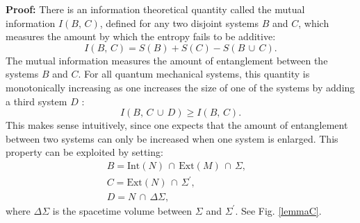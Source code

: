 \documentclass{article}
\begin{document}
\textbf{Proof:} There is an information theoretical quantity called the mutual information $I(B,\,C)$, defined for any two disjoint systems $B$ and $C$, which measures the amount by which the entropy fails to be additive:
\begin{equation}\label{I}
I(B,\,C) = S(B) + S(C) - S(B\,\cup\,C).
\end{equation}
The mutual information measures the amount of entanglement between the systems $B$ and $C$.  For all quantum mechanical systems, this quantity is monotonically increasing as one increases the size of one of the systems by adding a third system $D$ \cite{Imono}:
\begin{equation}\label{mono}
I(B,\,C\,\cup\,D) \ge I(B,\,C).
\end{equation}
This makes sense intuitively, since one expects that the amount of entanglement between two systems can only be increased when one system is enlarged.  This property can be exploited by setting:
\begin{eqnarray}
B = \mathrm{Int}(N)\,\cap\,\mathrm{Ext}(M)\,\cap\,\Sigma, & \\
C = \mathrm{Ext}(N)\,\cap\,\Sigma^\prime, & \\
D = N\,\cap\,\Delta \Sigma, &
\end{eqnarray}
where $\Delta \Sigma$ is the spacetime volume between $\Sigma$ and $\Sigma^\prime$.  See Fig. \ref{lemmaC}.  
\end{document}
